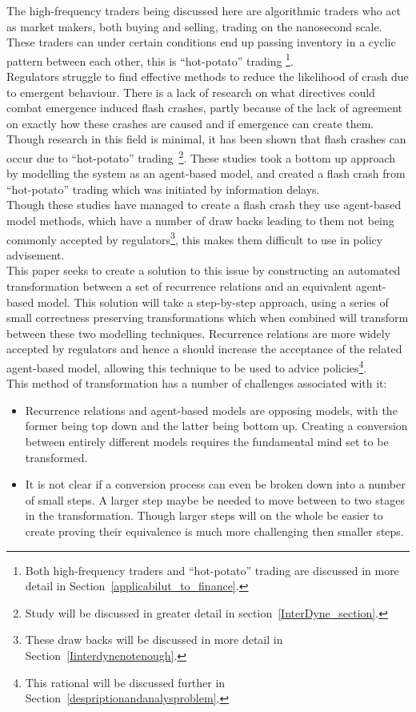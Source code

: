 \documentclass{article}
\begin{document}
The high-frequency traders being discussed here are algorithmic traders who act as market makers, both buying and selling, trading on the nanosecond scale. These traders can under certain conditions end up passing inventory in a cyclic pattern between each other, this is ``hot-potato'' trading \footnote{Both high-frequency traders and ``hot-potato'' trading are discussed in more detail in Section~\ref{applicabilut_to_finance}.}.\\
Regulators struggle to find effective methods to reduce the likelihood of crash due to emergent behaviour. There is a lack of research on what directives could combat emergence induced flash crashes, partly because of the lack of agreement on exactly how these crashes are caused and if emergence can create them. Though research in this field is minimal, it has been shown that flash crashes can occur due to ``hot-potato'' trading~\cite{otherabmflash, DynamicCoupling_Chris}\footnote{Study \cite{DynamicCoupling_Chris} will be discussed in greater detail in section~\ref{InterDyne_section}.}. These studies took a bottom up approach by modelling the system as an agent-based model, and created a flash crash from ``hot-potato'' trading which was initiated by information delays.\\
Though these studies have managed to create a flash crash they use agent-based model methods, which have a number of draw backs leading to them not being commonly accepted by regulators\footnote{These draw backs will be discussed in more detail in Section~\ref{Iinterdynenotenough}.}, this makes them difficult to use in policy advisement.\\
This paper seeks to create a solution to this issue by constructing an automated transformation between a set of recurrence relations and an equivalent agent-based model. This solution will take a step-by-step approach, using a series of small correctness preserving transformations which when combined will transform between these two modelling techniques. Recurrence relations are more widely accepted by regulators and hence a should increase the acceptance of the related agent-based model, allowing this technique to be used to advice policies\footnote{This rational will be discussed further in Section~\ref{despriptionandanalysproblem}.}.\\
This method of transformation has a number of challenges associated with it: 
\begin{itemize}
  \item Recurrence relations and agent-based models are opposing models, with the former being top down and the latter being bottom up. Creating a conversion between entirely different models requires the fundamental mind set to be transformed.    
  \item It is not clear if a conversion process can even be broken down into a number of small steps. A larger step maybe be needed to move between to two stages in the transformation. Though larger steps will on the whole be easier to create proving their equivalence is much more challenging then smaller steps. %
\end{itemize}
\end{document}
